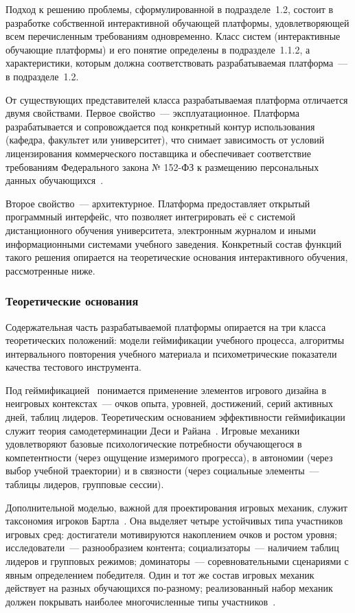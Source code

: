 Подход к решению проблемы, сформулированной в подразделе~1.2,
состоит в разработке собственной интерактивной обучающей платформы,
удовлетворяющей всем перечисленным требованиям одновременно. Класс
систем (интерактивные обучающие платформы) и его понятие определены
в подразделе~1.1.2, а характеристики, которым должна соответствовать
разрабатываемая платформа~--- в подразделе~1.2.

От существующих представителей класса разрабатываемая платформа
отличается двумя свойствами. Первое свойство~--- эксплуатационное.
Платформа разрабатывается и сопровождается под конкретный контур
использования (кафедра, факультет или университет), что снимает зависимость
от условий лицензирования коммерческого поставщика и обеспечивает
соответствие требованиям Федерального закона № 152-ФЗ к размещению
персональных данных обучающихся~\cite{fz152}.

Второе свойство~--- архитектурное. Платформа предоставляет открытый
программный интерфейс, что позволяет интегрировать её с системой
дистанционного обучения университета, электронным журналом и иными
информационными системами учебного заведения. Конкретный состав
функций такого решения опирается на теоретические основания
интерактивного обучения, рассмотренные ниже.

\subsubsection{Теоретические основания}

Содержательная часть разрабатываемой платформы опирается на три
класса теоретических положений: модели геймификации учебного
процесса, алгоритмы интервального повторения учебного материала
и психометрические показатели качества тестового инструмента.

Под геймификацией~\cite{deterding2011} понимается применение
элементов игрового дизайна в неигровых контекстах~--- очков опыта,
уровней, достижений, серий активных дней, таблиц лидеров.
Теоретическим основанием эффективности геймификации служит теория
самодетерминации Деси и Райана~\cite{deci_ryan_2000}. Игровые механики
удовлетворяют базовые психологические потребности обучающегося
в компетентности (через ощущение измеримого прогресса),
в автономии (через выбор учебной траектории) и в связности
(через социальные элементы~--- таблицы лидеров, групповые сессии).

Дополнительной моделью, важной для проектирования игровых механик,
служит таксономия игроков Бартла~\cite{bartle1996}. Она выделяет
четыре устойчивых типа участников игровых сред: достигатели
мотивируются накоплением очков и ростом уровня; исследователи~---
разнообразием контента; социализаторы~--- наличием таблиц лидеров
и групповых режимов; доминаторы~--- соревновательными сценариями
с явным определением победителя. Один и тот же состав игровых
механик действует на разных обучающихся по-разному; реализованный
набор механик должен покрывать наиболее многочисленные типы
участников~\cite{koivisto2019}.

